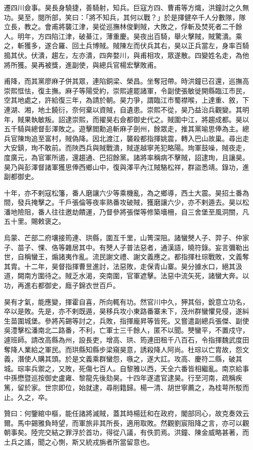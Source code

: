 \begin{pinyinscope}
遷四川僉事。昊長身驍捷，善騎射，知兵。巨寇方四、曹甫等方熾，洪鐘討之久無功。昊至，閱所部，笑曰：「將不知兵，其何以戰？」於是擇健卒千人分數隊，隊立長，教之。會甫將襲江津，昊從巡撫林俊剿賊，大敗之，俘斬及焚死者二千餘人。明年，方四陷江津，破綦江，薄重慶。昊夜出百騎，舉火擊賊，賊驚潰。乘之，斬獲多，遂合羅、回土兵博賊。賊陳左而伏兵其右，昊以正兵當左，身率百騎搗其伏。伏潰，趨左，左亦潰，四奔婺川，與甫相攻，眾遂散。四變姓名走，為他將所獲。昊再被獎，進副使，與總兵官楊宏擊敗甫。

甫降，而其黨廖麻子併其眾，連陷銅梁、榮昌。坐奪冠帶。時洪鐘已召還，巡撫高崇熙恇怯，復主撫。麻子等陽受約，崇熙遽罷諸軍，令副使張敏徙開縣臨江市民，空其地處之，許給復三年，為請於朝。昊力爭，謂臨江市蜀襟喉，上達重、敘，下連湖、湘，地土饒衍，奈何棄以資賊，自遺患。崇熙不從，昊乃益治兵觀變。其明年，賊果執敏叛。詔逮崇熙，而擢昊右僉都御史代之。賊圍中江，將趨成都。昊以五千騎與總督彭澤敗之。遊擊閻勳追斬麻子劍州，餘眾走，推其黨喻思俸為主。總兵官陳珣追至富村，賊偽降。因北渡江，襲殺都指揮姚震，轉入巴山故巢。尋出走大安鎮，珣不敢前。而陜西兵與賊戰潰，賊遂越寧羌犯略陽。珣軍鼓噪，賊夜走，度廣元，為官軍所遏，還趨通、巴招餘黨。諸將率稱病不擊賊，詔逮珣，且讓昊。昊乃與彭澤督諸軍獲思俸西鄉山中，復與澤平內江賊駱松祥，群盜悉靖。錄功，進副都御史。

十年，亦不剌寇松籓，番人磨讓六少等乘機亂，為之鄉導，西土大震。昊招土番為間，發兵掩擊之。千戶張倫等夜率熟番攻破賊，獲磨讓六少，亦不剌遁去。昊以松潘地險阻，番人往往邀劫饋運，乃督參將張傑等修築墻柵，自三舍堡至風洞關，凡五十里。賜敕褒之。

烏蒙、芒部二府壤接筠連、珙縣，圍亙千里，山箐深阻。諸蠻僰人子、羿子、仲家子、苗子、惈、佫等雜居其中。有僰人子普法惡者，通漢語，曉符錄。妄言彌勒出世，自稱蠻王，煽諸夷作亂。流民謝文禮、謝文義應之。都指揮杜琮戰敗，文義奪其胄。十二年，昊督指揮曹昱進討，法惡敗，走保青山寨。昊分據水口，絕其汲道，闕南方圍待之。賊乏水渴，突南圍，官軍遮擊。法惡中流矢死，諸蠻大奔。以功，再進右都御史，廕子錦衣世百戶。

昊有才氣，能應變，揮霍自喜，所向輒有功。然官川中久，狎其俗，銳意立功名，卒以是敗。先是，亦不剌既遁，昊移兵攻小東路番寨未下，茂州群蠻懼見侵，遂糾生苗圍城堡。參將芮錫等討之，兵敗，指揮龐昇等皆死。又嘗遣副總兵張傑、副使吳澧擊松潘南北二路番，不利，亡軍士三千餘人，匿不以聞。僰蠻平，不置戍守，遽班師。請改高縣為州，設長吏，增高、珙、筠連田租千八百石，令指揮魏武度田奪降人業給之軍民。而珙縣知縣步梁窺昊意，誘殺降人阿尚。杜琮以亡胄故，怨文義，潛使人購其頭。於是文義乘群蠻怨，嗾之，遂大訌。攻高、慶符二縣，破其城。琮率兵禦之，又敗，死傷七百人。自黎雅以西，天全六番皆相繼亂。南京給事中孫懋暨巡按御史盧雍、黎龍先後劾昊。十四年遂遣官逮昊。行至河南，疏稱疾篤，留於家。世宗即位，始就逮，尋削籍歸。楊一清、胡世寧薦之，為桂萼所駁而止。久之，卒。

贊曰：何鑒綰中樞，能任諸將滅賊，蓋其時楊廷和在政府，閣部同心，故克奏效云爾。馬中錫雅負時望，而軍旅非其所長，適用取敗。然觀劉宸阻降之言，亦可以觀朝事矣。陸完交結之罪浮於首功，得從八議，有佚罰焉。洪鐘、陳金威略甚著，而土兵之謠，聞之心惻，斯又統戎旃者所當留意也。


\end{pinyinscope}